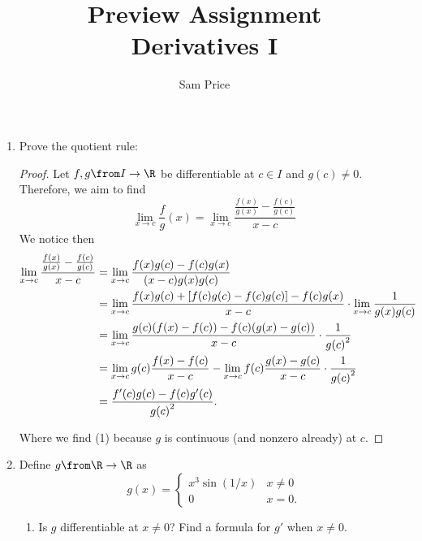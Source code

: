 \documentclass{article}
\author{Sam Price}
\date{}
\title{Preview Assignment\\\Large{Derivatives I}}
\begin{document}
\maketitle

\begin{enumerate}


  \item Prove the quotient rule:

        \noindent{}

        \begin{proof}
          Let $f, g \from I \to \R$ be differentiable at $c \in I$ and $g(c) \ne 0$.
          Therefore, we aim to find
          \[ \lim_{x \to c} \frac{f}{g}(x) =
            \lim_{x \to c} \frac{\frac{f(x)}{g(x)} - \frac{f(c)}{g(c)}}{x - c} \]
          We notice then
          \begin{align}
            \lim_{x \to c} \frac{\frac{f(x)}{g(x)}
            - \frac{f(c)}{g(c)}}{x - c} &= \lim_{x \to c}\frac{f(x)g(c) - f(c)g(x)}{(x - c)g(x)g(c)}\notag\\
            &= \lim_{x \to c} \frac{f(x)g(c) + [f(c)g(c) - f(c)g(c)] - f(c)g(x)}{x - c} \cdot \lim_{x \to c}\frac{1}{g(x)g(c)}\notag\\
            &= \lim_{x \to c} \frac{g(c)(f(x) - f(c)) - f(c)(g(x) - g(c))}{x - c} \cdot \frac{1}{{g(c)}^{2}}\\
            &= \lim_{x \to c} g(c)\frac{f(x) - f(c)}{x - c} - \lim_{x \to c} f(c)\frac{g(x) - g(c)}{x - c} \cdot \frac{1}{{g(c)}^{2}}\notag\\
            &= \frac{f'(c)g(c) - f(c)g'(c)}{{g(c)}^{2}}\notag.
          \end{align}

          Where we find (1) because $g$ is continuous (and nonzero already) at $c$.
        \end{proof}

  \item Define $g \from \R \to \R$ as
        \[ g(x) = \begin{cases}
          x^{3}\sin(1/x) & x \ne 0\\
          0 & x = 0.
        \end{cases} \]

        \begin{enumerate}
          \item Is $g$ differentiable at $x \ne 0$? Find a formula for $g'$ when $x \ne 0$.


\end{enumerate}
\end{enumerate}
\end{document}
